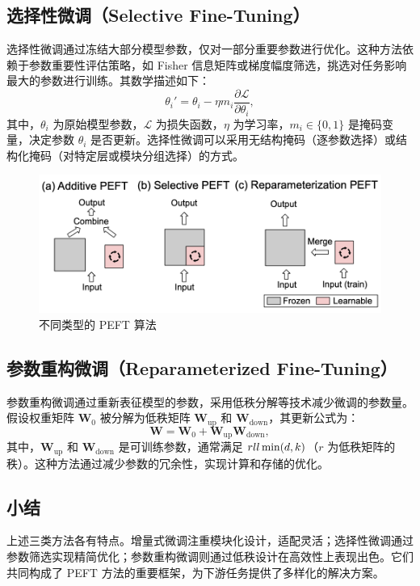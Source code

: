 \documentclass[12pt,a4paper,twoside]{article} %
\begin{document}
\begin{multicols}{2}
\subsection{选择性微调（Selective Fine-Tuning）}
选择性微调通过冻结大部分模型参数，仅对一部分重要参数进行优化。这种方法依赖于参数重要性评估策略，如 Fisher 信息矩阵或梯度幅度筛选，挑选对任务影响最大的参数进行训练。其数学描述如下：
\begin{equation}
\theta_i' = \theta_i - \eta m_i \frac{\partial \mathcal{L}}{\partial \theta_i},
\label{eq:selective}
\end{equation}
其中，$\theta_i$ 为原始模型参数，$\mathcal{L}$ 为损失函数，$\eta$ 为学习率，$m_i \in \{0, 1\}$ 是掩码变量，决定参数 $\theta_i$ 是否更新。选择性微调可以采用无结构掩码（逐参数选择）或结构化掩码（对特定层或模块分组选择）的方式。

\begin{figure}[H]
    \centering
    \includegraphics[width=\linewidth]{img/categorize.png}
    \caption{不同类型的 PEFT 算法}
    \label{fig:categorize}
\end{figure}

\subsection{参数重构微调（Reparameterized Fine-Tuning）}
参数重构微调通过重新表征模型的参数，采用低秩分解等技术减少微调的参数量。假设权重矩阵 $\mathbf{W}_0$ 被分解为低秩矩阵 $\mathbf{W}_{\text{up}}$ 和 $\mathbf{W}_{\text{down}}$，其更新公式为：
\begin{equation}
\mathbf{W} = \mathbf{W}_0 + \mathbf{W}_{\text{up}} \mathbf{W}_{\text{down}},
\label{eq:reparameterized}
\end{equation}
其中，$\mathbf{W}_{\text{up}}$ 和 $\mathbf{W}_{\text{down}}$ 是可训练参数，通常满足 $r \\ll \min(d, k)$（$r$ 为低秩矩阵的秩）。这种方法通过减少参数的冗余性，实现计算和存储的优化。

\subsection{小结}
上述三类方法各有特点。增量式微调注重模块化设计，适配灵活；选择性微调通过参数筛选实现精简优化；参数重构微调则通过低秩设计在高效性上表现出色。它们共同构成了 PEFT 方法的重要框架，为下游任务提供了多样化的解决方案。



\end{multicols}
\end{document}
